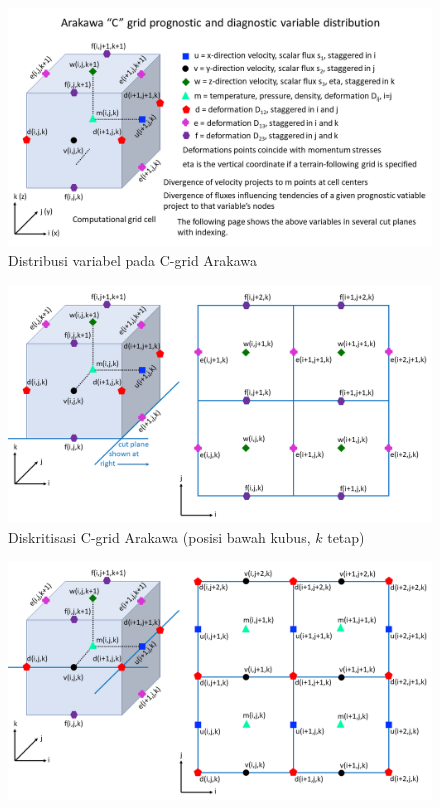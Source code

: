 \begin{spacing}{1.5}
	\begin{figure}[H]
		\centering
		\includegraphics[width=1\textwidth]{contents/Arakawa_1.png}		
		\caption{Distribusi variabel pada C-grid Arakawa}
		\label{fig:arakawa_1}
	\end{figure}
	\begin{figure}[H]
		\centering
		\includegraphics[width=1\textwidth]{contents/Arakawa_2.png}	
		\caption{Diskritisasi C-grid Arakawa (posisi bawah kubus, $k$ tetap)}
		\label{fig:arakawa_2}
	\end{figure}
	\begin{figure}[H]
		\centering
		\includegraphics[width=1\textwidth]{contents/Arakawa_3.png}	

\end{figure}
\end{spacing}
